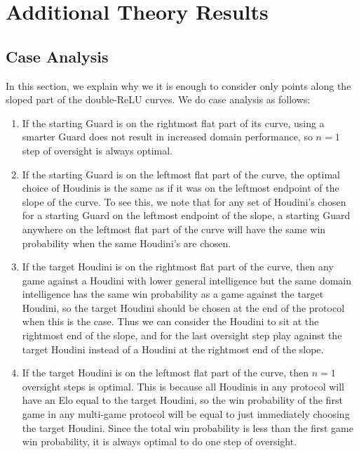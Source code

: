 \documentclass{article}
\begin{document}
\section{Additional Theory Results}
\label{app:add_theory}

\subsection{Case Analysis}
\label{app:cases}

In this section, we explain why we it is enough to consider only points along the sloped part of the double-ReLU curves. We do case analysis as follows:

\begin{enumerate}
    \item If the starting Guard is on the rightmost flat part of its curve, using a smarter Guard does not result in increased domain performance, so $n=1$ step of oversight is always optimal.
    \item If the starting Guard is on the leftmost flat part of the curve, the optimal choice of Houdinis is the same as if it was on the leftmost endpoint of the slope of the curve. To see this, we note that for any set of Houdini's chosen for a starting Guard on the leftmost endpoint of the slope, a starting Guard anywhere on the leftmost flat part of the curve will have the same win probability when the same Houdini's are chosen. 
    \item If the target Houdini is on the rightmost flat part of the curve, then any game against a Houdini with lower general intelligence but the same domain intelligence has the same win probability as a game against the target Houdini, so the target Houdini should be chosen at the end of the protocol when this is the case. Thus we can consider the Houdini to sit at the rightmost end of the slope, and for the last oversight step play against the target Houdini instead of a Houdini at the rightmost end of the slope. 
    \item If the target Houdini is on the leftmost flat part of the curve, then $n = 1$ oversight steps is optimal. This is because all Houdinis in any protocol will have an Elo equal to the target Houdini, so the win probability of the first game in any multi-game protocol will be equal to just immediately choosing the target Houdini. Since the total win probability is less than the first game win probability, it is always optimal to do one step of oversight.
\end{enumerate}
\end{document}
